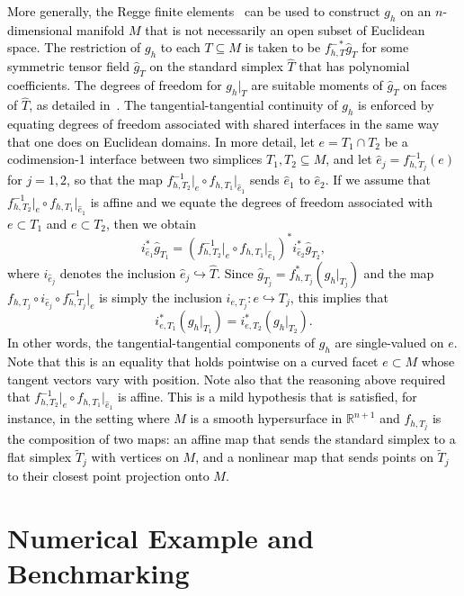 \documentclass[11pt]{article}
\newcommand{\correction}[2]{\textcolor{red}{}\textcolor{black}{#2}}
\begin{document}
\correction{}{More generally, the Regge finite elements~\cite{Li} can be used to construct $g_h$ on an $n$-dimensional manifold $M$ that is not necessarily an open subset of Euclidean space. The restriction of $g_h$ to each $T \subseteq M$ is taken to be $f_{h,T}^{-*} \hat{g}_T$ for some symmetric tensor field $\hat{g}_T$ on the standard simplex $\hat{T}$ that has polynomial coefficients.  The degrees of freedom for $g_h|_T$ are suitable moments of $\hat{g}_T$ on faces of $\hat{T}$, as detailed in~\cite{Li}.  The tangential-tangential continuity of $g_h$ is enforced by equating degrees of freedom associated with shared interfaces in the same way that one does on Euclidean domains.  In more detail, let $e = T_1 \cap T_2$ be a codimension-1 interface between two simplices $T_1,T_2 \subseteq M$, and let $\hat{e}_j = f_{h,T_j}^{-1}(e)$ for $j=1,2$, so that the map $f_{h,T_2}^{-1}\big|_e \circ f_{h,T_1}\big|_{\hat{e}_1}$ sends $\hat{e}_1$ to $\hat{e}_2$.  If we assume that $f_{h,T_2}^{-1}\big|_e \circ f_{h,T_1}\big|_{\hat{e}_1}$ is affine and we equate the degrees of freedom associated with $e \subset T_1$ and $e \subset T_2$, then we obtain
\[
i_{\hat{e}_1}^* \hat{g}_{T_1} = \left( f_{h,T_2}^{-1}\big|_e \circ f_{h,T_1}\big|_{\hat{e}_1} \right)^* i_{\hat{e}_2}^* \hat{g}_{T_2},
\]
where $i_{\hat{e}_j}$ denotes the inclusion $\hat{e}_j \hookrightarrow \hat{T}$.  Since $\hat{g}_{T_j} = f_{h,T_j}^* (g_h|_{T_j})$ and the map $f_{h,T_j} \circ i_{\hat{e}_j} \circ f_{h,T_j}^{-1}\big|_e$ is simply the inclusion $i_{e,T_j} : e \hookrightarrow T_j$, this implies that
\[
i_{e,T_1}^* (g_h|_{T_1}) = i_{e,T_2}^* (g_h|_{T_2}).
\]
In other words, the tangential-tangential components of $g_h$ are single-valued on $e$.  Note that this is an equality that holds pointwise on a curved facet $e \subset M$ whose tangent vectors vary with position.  Note also that the reasoning above required that $f_{h,T_2}^{-1}\big|_e \circ f_{h,T_1}\big|_{\hat{e}_1}$ is affine.  This is a mild hypothesis that is satisfied, for instance, in the setting where $M$ is a smooth hypersurface in $\mathbb{R}^{n+1}$ and $f_{h,T_j}$ is the composition of two maps: an affine map that sends the standard simplex to a flat simplex $\widetilde{T}_j$ with vertices on $M$, and a nonlinear map that sends points on $\widetilde{T}_j$ to their closest point projection onto $M$.
}

\section{Numerical Example and Benchmarking}
\end{document}
